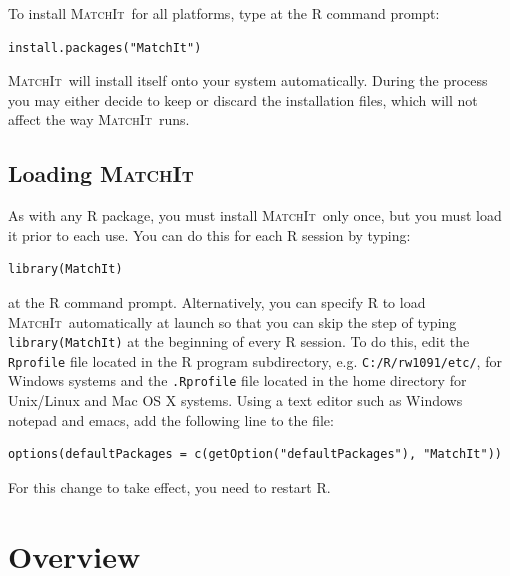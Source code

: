 \documentclass[oneside,letterpaper,titlepage]{article}
\newcommand{\MatchIt}{\textsc{MatchIt}}
\begin{document}
To install \MatchIt\ for all platforms, type at the R command prompt:
\begin{verbatim}
install.packages("MatchIt")
\end{verbatim}

  \noindent \MatchIt\ will install itself onto your system
  automatically.  During the process you may either decide to keep or
  discard the installation files, which will not affect the way
  \MatchIt\ runs.

\subsection{Loading \MatchIt}
As with any R package, you must install \MatchIt\ only once, but you
must load it prior to each use.  You can do this for each R session by
typing:
\begin{verbatim}
library(MatchIt) 
\end{verbatim}
at the R command prompt.  Alternatively, you can specify R to load
\MatchIt\ automatically at launch so that you can skip the step of
typing {\tt library(MatchIt)} at the beginning of every R session.  To
do this, edit the {\tt Rprofile} file located in the R program
subdirectory, e.g. \texttt{C:/R/rw1091/etc/}, for Windows systems and
the {\tt .Rprofile} file located in the home directory for Unix/Linux
and Mac OS X systems.  Using a text editor such as Windows notepad and
emacs, add the following line to the file:
\begin{verbatim}
options(defaultPackages = c(getOption("defaultPackages"), "MatchIt"))
\end{verbatim}
For this change to take effect, you need to restart R.

%



\section{Overview}
\end{document}
